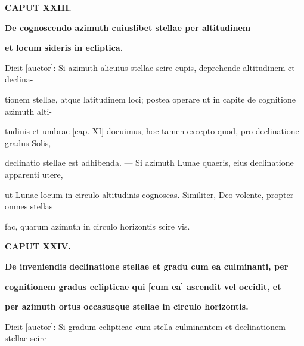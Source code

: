 \documentclass[11pt]{article}
\begin{document}
\hypertarget{AB01-PDF0124-body-L022}{}\begin{center}\bfseries CAPUT XXIII.\end{center}
\hypertarget{AB01-PDF0124-body-L023}{}\begin{center}\bfseries De cognoscendo azimuth cuiuslibet stellae per altitudinem\end{center}
\hypertarget{AB01-PDF0124-body-L024}{}\begin{center}\bfseries et locum sideris in ecliptica.\end{center}
\noindent\hypertarget{AB01-PDF0124-body-L025}{}Dicit [auctor]: Si azimuth alicuius stellae scire cupis, deprehende altitudinem et declina-\strut\par
\noindent\hypertarget{AB01-PDF0124-body-L026}{}tionem stellae, atque latitudinem loci; postea operare ut in capite de cognitione azimuth alti-\strut\par
\noindent\hypertarget{AB01-PDF0124-body-L027}{}tudinis et umbrae [cap. XI] docuimus, hoc tamen excepto quod, pro declinatione gradus Solis,\strut\par
\noindent\hypertarget{AB01-PDF0124-body-L028}{}declinatio stellae est adhibenda. — Si azimuth Lunae quaeris, eius declinatione apparenti utere,\strut\par
\noindent\hypertarget{AB01-PDF0124-body-L029}{}ut Lunae locum in circulo altitudinis cognoscas. Similiter, Deo volente, propter omnes stellas\strut\par
\noindent\hypertarget{AB01-PDF0124-body-L030}{}fac, quarum azimuth in circulo horizontis scire vis.\strut\par
\hypertarget{AB01-PDF0124-body-L031}{}\begin{center}\bfseries CAPUT XXIV.\end{center}
\hypertarget{AB01-PDF0124-body-L032}{}\begin{center}\bfseries De inveniendis declinatione stellae et gradu cum ea culminanti, per\end{center}
\hypertarget{AB01-PDF0124-body-L033}{}\begin{center}\bfseries cognitionem gradus eclipticae qui [cum ea] ascendit vel occidit, et\end{center}
\hypertarget{AB01-PDF0124-body-L034}{}\begin{center}\bfseries per azimuth ortus occasusque stellae in circulo horizontis.\end{center}
\noindent\hypertarget{AB01-PDF0124-body-L035}{}Dicit [auctor]: Si gradum eclipticae cum stella culminantem et declinationem stellae scire\strut\par
\end{document}
